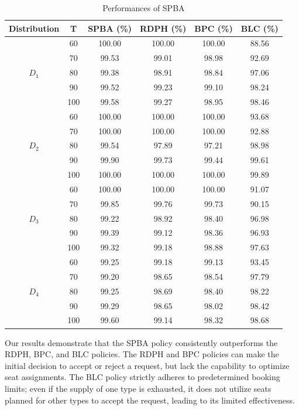 \begin{table}[h]
  \centering
  \caption{Performances of SPBA}\label{tab_perf}
  \begin{tabular}{cccccc}
  \hline
  \hline
  Distribution & T & SPBA (\%) & RDPH (\%) & BPC (\%) & BLC (\%) \\
  \hline
  \multirow{5}{*}{$D_1$} & 60 & 100.00 & 100.00 & 100.00 & 88.56 \\
  & 70    & 99.53 & 99.01 & 98.98 & 92.69  \\
  & 80    & 99.38 & 98.91 & 98.84 & 97.06  \\
  & 90    & 99.52 & 99.23 & 99.10 & 98.24  \\
  & 100   & 99.58 & 99.27 & 98.95 & 98.46 \\
  \hline
  \multirow{5}{*}{$D_2$} & 60  & 100.00 & 100.00 & 100.00 & 93.68  \\
     & 70  & 100.00 & 100.00 & 100.00 & 92.88  \\
     & 80  & 99.54 & 97.89 & 97.21 & 98.98  \\
     & 90  & 99.90 & 99.73 & 99.44 & 99.61  \\
     & 100 & 100.00 & 100.00 & 100.00 & 99.89  \\ 
  \hline
  \multirow{5}{*}{$D_3$} & 60  & 100.00 & 100.00 & 100.00 & 91.07  \\
  & 70  & 99.85 & 99.76 & 99.73 & 90.15 \\
  & 80  & 99.22 & 98.92 & 98.40 & 96.98  \\
  & 90  & 99.39 & 99.12 & 98.36 & 96.93  \\
  & 100  & 99.32 & 99.18 & 98.88 & 97.63  \\
    \hline
    \multirow{5}{*}{$D_4$} & 60  & 99.25 & 99.18 & 99.13 & 93.45  \\
     & 70  & 99.20 & 98.65 & 98.54 & 97.79  \\
     & 80  & 99.25 & 98.69 & 98.40 & 98.22 \\
     & 90  & 99.29 & 98.65 & 98.02 & 98.42  \\
     & 100 & 99.60 & 99.14 & 98.32 & 98.68 \\
  \hline
  \hline
  \end{tabular}
\end{table}

Our results demonstrate that the SPBA policy consistently outperforms the RDPH, BPC, and BLC policies. The RDPH and BPC policies can make the initial decision to accept or reject a request, but lack the capability to optimize seat assignments. The BLC policy strictly adheres to predetermined booking limits; even if the supply of one type is exhausted, it does not utilize seats planned for other types to accept the request, leading to its limited effectiveness.

